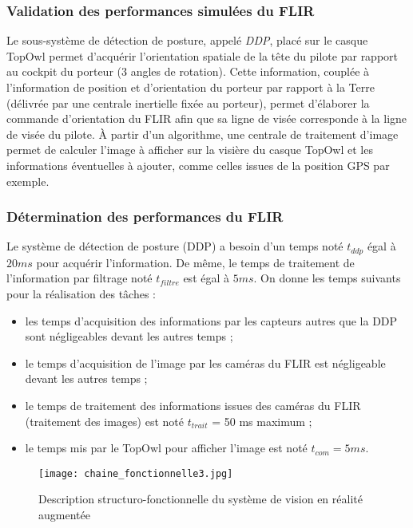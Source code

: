 \subsubsection{Validation des performances simulées du FLIR}

Le sous-système de détection de posture, appelé \textit{DDP}, placé sur le casque TopOwl permet d'acquérir l'orientation
spatiale de la tête du pilote par rapport au cockpit du porteur (3 angles de rotation). Cette information, couplée
à l'information de position et d'orientation du porteur par rapport à la Terre (délivrée par une centrale inertielle fixée au porteur), permet d'élaborer la commande d'orientation du FLIR afin que sa ligne de visée corresponde
à la ligne de visée du pilote. À partir d'un algorithme, une centrale de traitement d'image permet de calculer
l'image à afficher sur la visière du casque TopOwl et les informations éventuelles à ajouter, comme celles issues
de la position GPS par exemple.

\subsubsection{Détermination des performances du FLIR}

Le système de détection de posture (DDP) a besoin d'un temps noté $t_{ddp}$ égal à $20 ms$ pour acquérir l'information. De même, le temps de traitement de l'information par filtrage noté $t_{filtre}$ est égal à $5 ms$.
On donne les temps suivants pour la réalisation des tâches :
\begin{itemize}
\item les temps d'acquisition des informations par les capteurs autres que la DDP sont négligeables devant les
autres temps ;
\item le temps d'acquisition de l'image par les caméras du FLIR est négligeable devant les autres temps ;
\item le temps de traitement des informations issues des caméras du FLIR (traitement des images) est noté
$t_{trait}$ = 50 ms maximum ;
\item le temps mis par le TopOwl pour afficher l'image est noté $t_{com} = 5 ms$.
\end{itemize}

\begin{figure}[!htb]
\begin{center}
\texttt{[image: chaine\_fonctionnelle3.jpg]}
\caption{Description structuro-fonctionnelle du système de vision en réalité augmentée \label{chaine_fonctionnelle}}
\end{center}
\end{figure}

